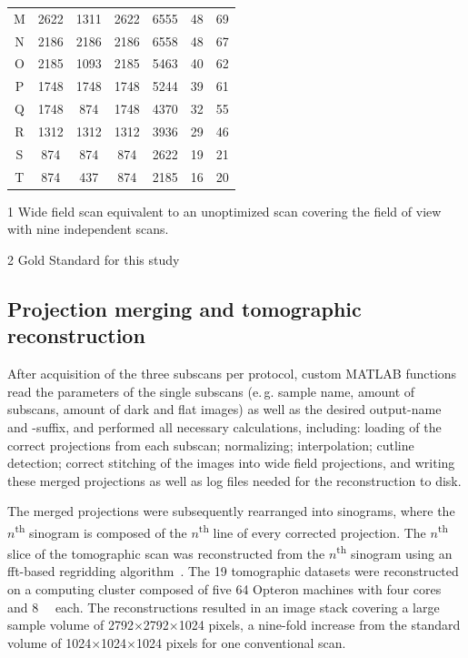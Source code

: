 {\begin{threeparttable}
\begin{tabular}{ccccccc}
		M & 2622 & 1311 & 2622 & 6555  &  48 & 69\\
		N & 2186 & 2186 & 2186 & 6558  &  48 & 67\\
		O & 2185 & 1093 & 2185 & 5463  &  40 & 62\\
		P & 1748 & 1748 & 1748 & 5244  &  39 & 61\\
		Q & 1748 & 874  & 1748 & 4370  &  32 & 55\\
		R & 1312 & 1312 & 1312 & 3936  &  29 & 46\\
		S & 874  & 874  & 874  & 2622  &  19 & 21\\
		\rowcolor{lightgray} T & 874  & 437  & 874  & 2185  &  16  & 20\\
		\bottomrule
	\end{tabular}
	\begin{tablenotes}
		\footnotesize
		\item[1] Wide field scan equivalent to an unoptimized scan covering the field of view with nine independent scans.
		\item[2] Gold Standard for this study
	\end{tablenotes}
\end{threeparttable}
}

\subsection{Projection merging and tomographic reconstruction}
After acquisition of the three subscans per protocol, custom MATLAB functions read the parameters of the single subscans (e.\,g. sample name, amount of subscans, amount of dark and flat images) as well as the desired output-name and -suffix, and performed all necessary calculations, including: loading of the correct projections from each subscan; normalizing; interpolation; cutline detection; correct stitching of the images into wide field projections, and writing these merged projections as well as log files needed for the reconstruction to disk.

The merged projections were subsequently rearranged into sinograms, where the $n$\textsuperscript{th} sinogram is composed of the $n$\textsuperscript{th} line of every corrected projection. The $n$\textsuperscript{th} slice of the tomographic scan was reconstructed from the $n$\textsuperscript{th} sinogram using an \acs{fft}-based regridding algorithm~\cite{Dowd1999,Marone2008}. The 19 tomographic datasets were reconstructed on a computing cluster composed of five \SI{64}{\bit} Opteron machines with four cores and \SI{8}{\giga\byte}  each. The reconstructions resulted in an image stack covering a large sample volume of 2792$\times$2792$\times$1024 pixels, a nine-fold increase from the standard volume of 1024$\times$1024$\times$1024 pixels for one conventional scan.

